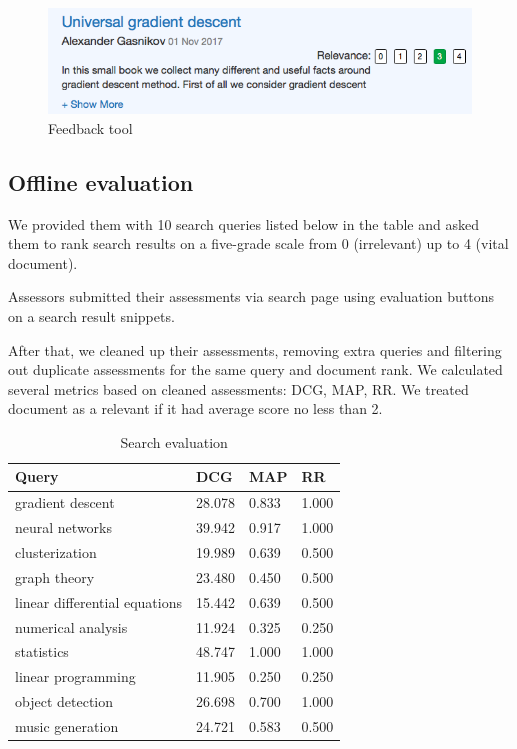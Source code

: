 \begin{figure}
  \includegraphics[width=\linewidth]{screenshot_2.png}
  \caption{Feedback tool}
  \label{fig:search_page}
\end{figure}

\subsection{Offline evaluation}
We provided them with 10 search queries listed below in the table and asked them to rank search results on a five-grade scale from 0 (irrelevant) up to 4 (vital document).

Assessors submitted their assessments via search page using evaluation buttons on a search result snippets.

After that, we cleaned up their assessments, removing extra queries and filtering out duplicate assessments for the same query and document rank.
We calculated several metrics based on cleaned assessments: DCG, MAP, RR. We treated document as a relevant if it had average score no less than 2.

\begin{table}
    \centering 
    \begin{tabular}{| l | l | l | l |}
        \toprule
        Query & DCG & MAP & RR \\ 
        \midrule
        gradient descent & 28.078 & 0.833 & 1.000 \\  
        neural networks & 39.942 & 0.917 & 1.000 \\  
        clusterization & 19.989 & 0.639 & 0.500 \\  
        graph theory & 23.480 & 0.450 & 0.500 \\  
        linear differential equations & 15.442 & 0.639 & 0.500 \\  
        numerical analysis & 11.924 & 0.325 & 0.250 \\  
        statistics & 48.747 & 1.000 & 1.000 \\  
        linear programming & 11.905 & 0.250 & 0.250 \\  
        object detection & 26.698 & 0.700 & 1.000 \\  
        music generation & 24.721 & 0.583 & 0.500 \\  
        \bottomrule
    \end{tabular}
    \caption{Search evaluation}
\end{table}

